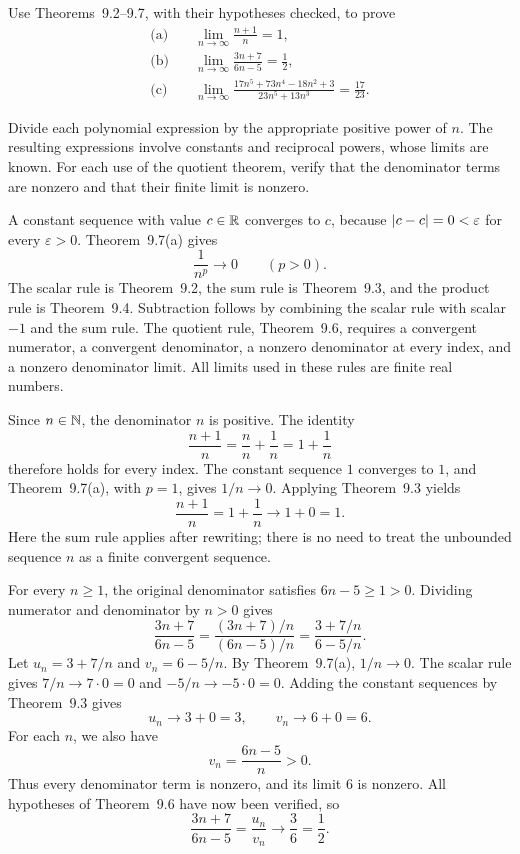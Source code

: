 \goal Use Theorems~9.2--9.7, with their hypotheses checked, to prove
\begin{align*}
 \text{(a)}\quad &\lim_{n\to\infty}\frac{n+1}{n}=1,\\
 \text{(b)}\quad &\lim_{n\to\infty}\frac{3n+7}{6n-5}=\frac12,\\
 \text{(c)}\quad &\lim_{n\to\infty}
 \frac{17n^5+73n^4-18n^2+3}{23n^5+13n^3}=\frac{17}{23}.
\end{align*}

\idea Divide each polynomial expression by the appropriate positive
power of $n$. The resulting expressions involve constants and
reciprocal powers, whose limits are known. For each use of the quotient
theorem, verify that the denominator terms are nonzero and that their
finite limit is nonzero.

A constant sequence with value $c\in\mathbb{R}$ converges to $c$, because
$\left|c-c\right|=0<\varepsilon$ for every $\varepsilon>0$.
Theorem~9.7(a) gives
\[
 \frac1{n^p}\longrightarrow0\qquad(p>0).
\]
The scalar rule is Theorem~9.2, the sum rule is Theorem~9.3,
and the product rule is Theorem~9.4. Subtraction follows by
combining the scalar rule with scalar $-1$ and the sum rule.
The quotient rule, Theorem~9.6, requires a convergent numerator,
a convergent denominator, a nonzero denominator at every index,
and a nonzero denominator limit. All limits used in these rules
are finite real numbers.

Since $n\in\mathbb{N}$, the denominator $n$ is positive. The identity
\[
 \frac{n+1}{n}=\frac nn+\frac1n=1+\frac1n
\]
therefore holds for every index. The constant sequence $1$ converges
to $1$, and Theorem~9.7(a), with $p=1$, gives $1/n\to0$.
Applying Theorem~9.3 yields
\[
 \frac{n+1}{n}=1+\frac1n\longrightarrow1+0=1.
\]
Here the sum rule applies after rewriting; there is no need to treat
the unbounded sequence $n$ as a finite convergent sequence.

For every $n\ge1$, the original denominator satisfies
$6n-5\ge1>0$. Dividing numerator and denominator by $n>0$ gives
\[
 \frac{3n+7}{6n-5}
 =\frac{(3n+7)/n}{(6n-5)/n}
 =\frac{3+7/n}{6-5/n}.
\]
Let $u_n=3+7/n$ and $v_n=6-5/n$.
By Theorem~9.7(a), $1/n\to0$. The scalar rule gives
$7/n\to7\cdot0=0$ and $-5/n\to-5\cdot0=0$.
Adding the constant sequences by Theorem~9.3 gives
\[
 u_n\longrightarrow3+0=3,
 \qquad v_n\longrightarrow6+0=6.
\]
For each $n$, we also have
\[
 v_n=\frac{6n-5}{n}>0.
\]
Thus every denominator term is nonzero, and its limit $6$ is nonzero.
All hypotheses of Theorem~9.6 have now been verified, so
\[
 \frac{3n+7}{6n-5}=\frac{u_n}{v_n}
 \longrightarrow\frac36=\frac12.
\]

